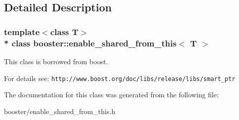 \subsection{Detailed Description}
\subsubsection*{template$<$class T$>$\\*
class booster\+::enable\+\_\+shared\+\_\+from\+\_\+this$<$ T $>$}

This class is borrowed from boost. 

For details see\+: {\tt http\+://www.\+boost.\+org/doc/libs/release/libs/smart\+\_\+ptr} 

The documentation for this class was generated from the following file\+:\begin{DoxyCompactItemize}
\item 
booster/enable\+\_\+shared\+\_\+from\+\_\+this.\+h\end{DoxyCompactItemize}
